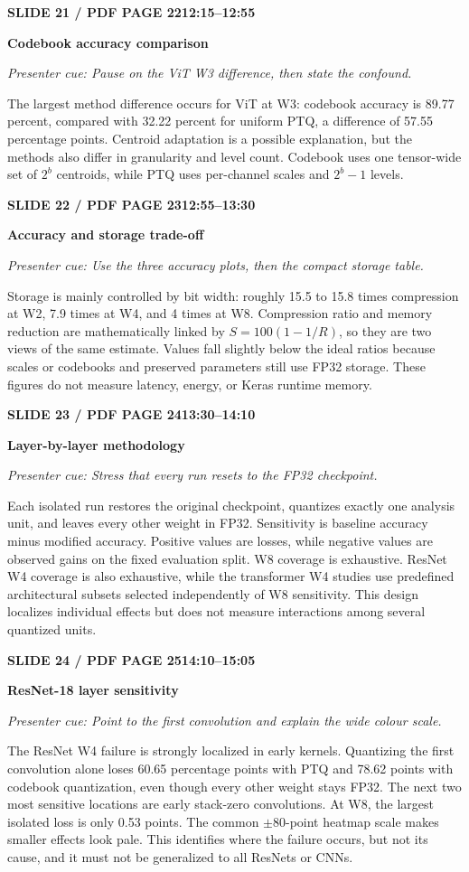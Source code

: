 \documentclass[11pt,a4paper]{article}
\newcommand{\slidetitle}[3]{%
  \vspace{2mm}\noindent
  \colorbox{TUblue}{\parbox{\dimexpr\textwidth-2\fboxsep}{\color{white}\bfseries #1\hfill #2}}%
  \par\textcolor{TUorange}{\bfseries #3}\par
}
\newcommand{\cue}[1]{\textit{\textcolor{TUblue}{Presenter cue: #1}}\par}
\newcommand{\spoken}[1]{#1\par}
\begin{document}
\slidetitle{SLIDE 21 / PDF PAGE 22}{12:15--12:55}{Codebook accuracy comparison}
\cue{Pause on the ViT W3 difference, then state the confound.}
\spoken{The largest method difference occurs for ViT at W3: codebook accuracy is 89.77 percent, compared with 32.22 percent for uniform PTQ, a difference of 57.55 percentage points. Centroid adaptation is a possible explanation, but the methods also differ in granularity and level count. Codebook uses one tensor-wide set of $2^b$ centroids, while PTQ uses per-channel scales and $2^b-1$ levels.}

\slidetitle{SLIDE 22 / PDF PAGE 23}{12:55--13:30}{Accuracy and storage trade-off}
\cue{Use the three accuracy plots, then the compact storage table.}
\spoken{Storage is mainly controlled by bit width: roughly 15.5 to 15.8 times compression at W2, 7.9 times at W4, and 4 times at W8. Compression ratio and memory reduction are mathematically linked by $S=100(1-1/R)$, so they are two views of the same estimate. Values fall slightly below the ideal ratios because scales or codebooks and preserved parameters still use FP32 storage. These figures do not measure latency, energy, or Keras runtime memory.}

\slidetitle{SLIDE 23 / PDF PAGE 24}{13:30--14:10}{Layer-by-layer methodology}
\cue{Stress that every run resets to the FP32 checkpoint.}
\spoken{Each isolated run restores the original checkpoint, quantizes exactly one analysis unit, and leaves every other weight in FP32. Sensitivity is baseline accuracy minus modified accuracy. Positive values are losses, while negative values are observed gains on the fixed evaluation split. W8 coverage is exhaustive. ResNet W4 coverage is also exhaustive, while the transformer W4 studies use predefined architectural subsets selected independently of W8 sensitivity. This design localizes individual effects but does not measure interactions among several quantized units.}

\slidetitle{SLIDE 24 / PDF PAGE 25}{14:10--15:05}{ResNet-18 layer sensitivity}
\cue{Point to the first convolution and explain the wide colour scale.}
\spoken{The ResNet W4 failure is strongly localized in early kernels. Quantizing the first convolution alone loses 60.65 percentage points with PTQ and 78.62 points with codebook quantization, even though every other weight stays FP32. The next two most sensitive locations are early stack-zero convolutions. At W8, the largest isolated loss is only 0.53 points. The common $\pm80$-point heatmap scale makes smaller effects look pale. This identifies where the failure occurs, but not its cause, and it must not be generalized to all ResNets or CNNs.}
\end{document}
